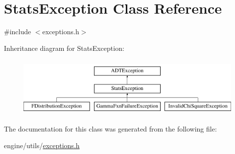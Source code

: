 \hypertarget{classStatsException}{
\section{StatsException Class Reference}
\label{classStatsException}
}


{\ttfamily \#include $<$exceptions.h$>$}

Inheritance diagram for StatsException:\begin{figure}[H]
\begin{center}
\leavevmode
\includegraphics[height=3cm]{classStatsException}
\end{center}
\end{figure}


The documentation for this class was generated from the following file:\begin{DoxyCompactItemize}
\item 
engine/utils/\hyperlink{exceptions_8h}{exceptions.h}\end{DoxyCompactItemize}
